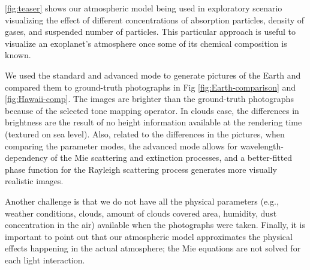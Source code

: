 \documentclass[journal]{vgtc}                %
\begin{document}
%
\autoref{fig:teaser} shows our atmospheric model being used in exploratory scenario visualizing the effect of different concentrations of absorption particles, density of gases, and suspended number of particles. This particular approach is useful to visualize an exoplanet's atmosphere once some of its chemical composition is known.

We used the standard and advanced mode to generate pictures of the Earth and compared them to ground-truth photographs in Fig \ref{fig:Earth-comparison} and \ref{fig:Hawaii-comp}. The images are brighter than the ground-truth photographs because of the selected tone mapping operator. In clouds case, the differences in brightness are the result of no height information available at the rendering time (textured on sea level).
Also, related to the differences in the pictures, when comparing the parameter modes, the advanced mode allows for wavelength-dependency of the Mie scattering and extinction processes, and a better-fitted phase function for the Rayleigh scattering process generates more visually realistic images. 

Another challenge is that we do not have all the physical parameters (e.g., weather conditions, clouds, amount of clouds covered area, humidity, dust concentration in the air) available when the photographs were taken.
Finally, it is important to point out that our atmospheric model approximates the physical effects happening in the actual atmosphere; the Mie equations are not solved for each light interaction. 






\end{document}
